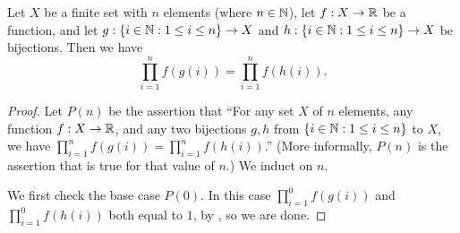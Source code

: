 \begin{ac}\label{i:ac:7.1.4}
  Let \(X\) be a finite set with \(n\) elements (where \(n \in \mathbb{N}\)), let \(f : X \to \mathbb{R}\) be a function, and let \(g : \left\lbrace i \in \mathbb{N} : 1 \leq i \leq n\right\rbrace \to X\) and \(h : \left\lbrace i \in \mathbb{N} : 1 \leq i \leq n\right\rbrace \to X\) be bijections.
  Then we have
  \[
    \prod_{i = 1}^n f(g(i)) = \prod_{i = 1}^n f(h(i)).
  \]
\end{ac}

\begin{proof}
  Let \(P(n)\) be the assertion that ``For any set \(X\) of \(n\) elements, any function \(f : X \to \mathbb{R}\), and any two bijections \(g, h\) from \(\left\lbrace i \in \mathbb{N} : 1 \leq i \leq n\right\rbrace\) to \(X\), we have \(\prod_{i = 1}^n f(g(i)) = \prod_{i = 1}^n f(h(i))\).''
  (More informally, \(P(n)\) is the assertion that  is true for that value of \(n\).)
  We induct on \(n\).

  We first check the base case \(P(0)\).
  In this case \(\prod_{i = 1}^0 f(g(i))\) and \(\prod_{i = 1}^0 f(h(i))\) both equal to \(1\), by , so we are done.


\end{proof}
